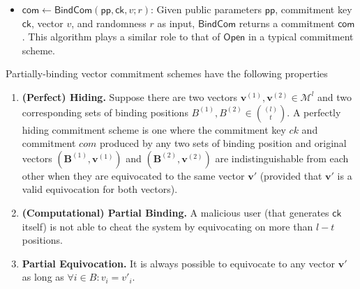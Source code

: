 \begin{definition}
\begin{itemize}
  \item $\mathsf{com} \leftarrow \mathsf{BindCom}(\mathsf{pp}, \mathsf{ck}, v; r)$: Given public parameters 
  $\mathsf{pp}$, commitment key $\mathsf{ck}$, vector $v$, and randomness $r$ as input, $\mathsf{BindCom}$ returns a commitment 
  $\mathsf{com}$. This algorithm plays a similar role to that of $\mathsf{Open}$ in a typical commitment scheme.
  \end{itemize}

  Partially-binding vector commitment schemes have the following properties
  
  \begin{enumerate}
    \item \textbf{(Perfect) Hiding.} Suppose there are two vectors $\mathbf{v}^{(1)}, \mathbf{v}^{(2)} \in \mathcal M^l$ and two corresponding sets of 
    binding positions $B^{(1)}, B^{(2)} \in {(l) \choose t}$. A perfectly hiding commitment scheme is one where the commitment key $ck$ and commitment $com$ 
    produced by any two sets of binding position and original vectors $(\mathbf{B}^{(1)}, \mathbf{v}^{(1)})$ and $(\mathbf{B}^{(2)}, \mathbf{v}^{(2)})$ are 
    indistinguishable from each other when they are equivocated to the same vector $\mathbf{v}'$ (provided that $\mathbf{v}'$ is a valid equivocation for 
    both vectors). 

    \item \textbf{(Computational) Partial Binding.} A malicious user (that generates $\mathsf{ck}$ itself) is not able to cheat the system by equivocating 
    on more than $l - t$ positions.

    \item \textbf{Partial Equivocation.} It is always possible to equivocate to any vector $\mathbf{v}'$ as long as $\forall i \in B: v_i = v'_i$. 
  \end{enumerate}


\end{definition}
